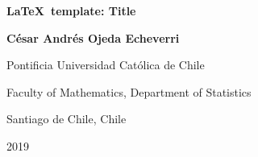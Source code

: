 \thispagestyle{empty}

\begin{center}
\begin{figure}
\centering
{}
\end{figure}\vspace*{2.0cm}

\textbf{\huge \LaTeX\ template: Title}\vspace*{4.0cm}

\Large\textbf{C\'{e}sar Andr\'{e}s Ojeda Echeverri}\vspace*{4.0cm}

\small Pontificia Universidad Cat\'{o}lica de Chile

Faculty of Mathematics, Department of Statistics

Santiago de Chile, Chile

2019
\end{center}

\newpage{\pagestyle{empty}\cleardoublepage}

\newpage

\thispagestyle{empty}

